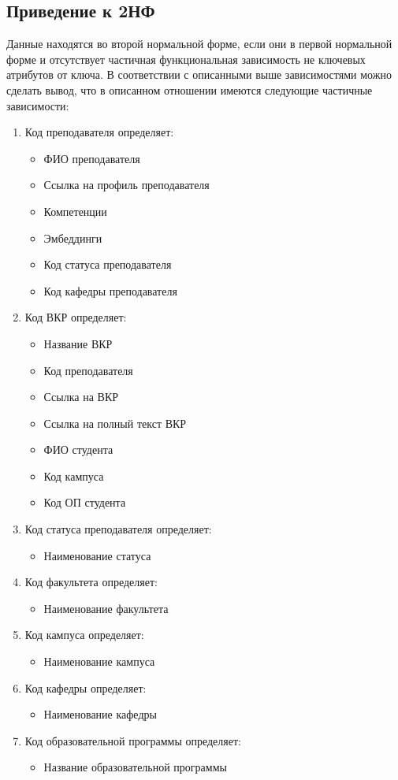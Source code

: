 \documentclass[PI,KR]{HSEUniversity}
\begin{document}
\subsection{Приведение к 2НФ}
Данные находятся во второй нормальной форме, если они в первой нормальной форме и отсутствует частичная функциональная зависимость не ключевых атрибутов от ключа.
В соответствии с описанными выше зависимостями можно сделать вывод, что в описанном отношении имеются следующие частичные зависимости:
\begin{enumerate}
	\item Код преподавателя определяет:
	\begin{itemize}
		\item ФИО преподавателя
		\item Ссылка на профиль преподавателя
		\item Компетенции
		\item Эмбеддинги
		\item Код статуса преподавателя
		\item Код кафедры преподавателя
	\end{itemize}
	\item Код ВКР определяет:
	\begin{itemize}
		\item Название ВКР
		\item Код преподавателя
		\item Ссылка на ВКР
		\item Ссылка на полный текст ВКР
		\item ФИО студента
		\item Код кампуса
		\item Код ОП студента
	\end{itemize}
	\item Код статуса преподавателя определяет:
	\begin{itemize}
		\item Наименование статуса
	\end{itemize}
	\item Код факультета определяет:
	\begin{itemize}
		\item Наименование факультета
	\end{itemize}
	\item Код кампуса определяет:
	\begin{itemize}
		\item Наименование кампуса
	\end{itemize}
	\item Код кафедры определяет:
	\begin{itemize}
		\item Наименование кафедры
	\end{itemize}
	\item Код образовательной программы определяет:
	\begin{itemize}
		\item Название образовательной программы
	\end{itemize}
\end{enumerate}
\end{document}
